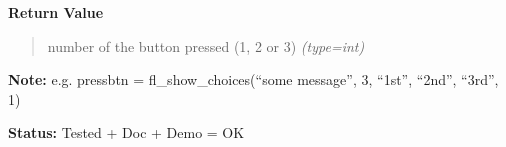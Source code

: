 \begin{boxedminipage}{\funcwidth}
      \textbf{Return Value}
    \vspace{-1ex}

      \begin{quote}

number of the button pressed (1, 2 or 3)
      {\it (type=int)}

      \end{quote}

\textbf{Note:} 
e.g. pressbtn = fl\_show\_choices(``some message'', 3, ``1st'', ``2nd'',
``3rd'', 1)


\textbf{Status:} 
Tested + Doc + Demo = OK


    \end{boxedminipage}

    \label{xformslib:flgoodies:fl_show_choice}

    \vspace{0.5ex}

